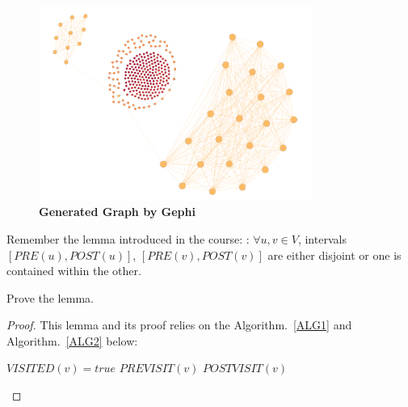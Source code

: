 \documentclass[12pt,a4paper]{article}
\makeatletter
\newtheorem*{solution}{Solution}
\theoremstyle{definition}
\renewenvironment{solution}[1][Solution] {\par\pushQED{\qed}\normalfont\topsep6\p@\@plus6\p@\relax\trivlist\item[\hskip\labelsep\bfseries#1\@addpunct{.}]\ignorespaces}{\popQED\endtrivlist\@endpefalse} \makeatother
\makeatother
\begin{document}
\begin{enumerate}
\begin{solution}
\begin{itemize}
        \begin{figure}[htbp]
        \centering
        \includegraphics[width=0.8\textwidth]{pictures/pic_0.pdf}
        \caption{\textbf{Generated Graph by Gephi}}\label{Graph0}
        \end{figure}
        \end{itemize}
    \end{solution}


\item
    Remember the lemma introduced in the course: : $\forall u, v \in V$, intervals $[PRE(u), POST(u)]$, $[PRE(v), POST(v)]$ are either disjoint or one is contained within the other.\par
Prove the lemma.\par
    \begin{proof}
        \renewcommand{\qedsymbol}{}
        This lemma and its proof relies on the Algorithm.~\ref{ALG1} and Algorithm.~\ref{ALG2} below:\item
        \begin{minipage}[t]{0.9\textwidth}
        \begin{algorithm}[H]
            \caption{$EXPLORE(G, v)$}
            \label{ALG1}
            \BlankLine
            $VISITED(v) = true$\;
            $PREVISIT(v)$\;
            $POSTVISIT(v)$\;
        \end{algorithm}
        \end{minipage}
        \hfill


        \begin{minipage}[t]{0.9\textwidth}
        \begin{algorithm}[H]
            \caption{$DFS(G)$}
            \label{ALG2}
            \BlankLine
            

\end{algorithm}
\end{minipage}
\end{proof}
\end{enumerate}
\end{document}
